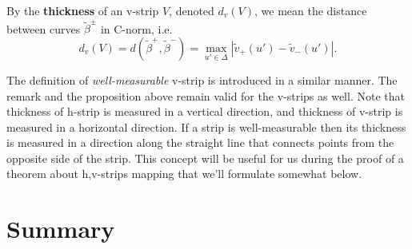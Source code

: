 \begin{definition}
	By the {\bf thickness} of an v-strip $V$, denoted $d_v(V)$, we mean the distance between curves $\widetilde{\beta}^{\pm}$ in C-norm, i.e.
	\begin{equation}
		d_v(V) = d(\widetilde{\beta}^+, \widetilde{\beta}^-) = \max \limits_{u' \in \Delta} |\widetilde{v}_+(u') - \widetilde{v}_-(u')|.
	\label{eq:v-thickness}
	\end{equation}
\end{definition}

The definition of {\it well-measurable} v-strip is introduced in a similar manner.
The remark and the proposition above remain valid for the v-strips as well.
Note that thickness of h-strip is measured in a vertical direction, and thickness of v-strip is measured in a horizontal direction.
If a strip is well-measurable then its thickness is measured in a direction along the straight line that connects points from the opposite side of the strip.
This concept will be useful for us during the proof of a theorem about h,v-strips mapping that we'll formulate somewhat below.



\section{Summary}